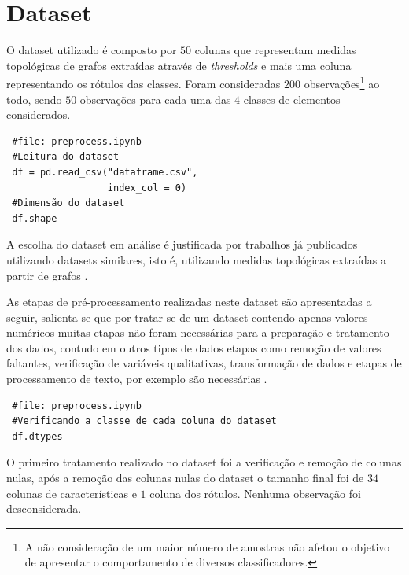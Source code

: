 \documentclass[
	article,			%
	11pt,				%
	oneside,			%
	a4paper,			%
	english,			%
	brazil,				%
	sumario=tradicional
	]{abntex2}
\begin{document}
\textual

\section{Dataset}

O dataset utilizado é composto por $50$ colunas que representam medidas topológicas de grafos extraídas através de \textit{thresholds} e mais uma coluna representando os rótulos das classes. Foram consideradas $200$ observações\footnote{A não consideração de um maior número de amostras não afetou o objetivo de apresentar o comportamento de diversos classificadores.} ao todo, sendo $50$ observações para cada uma das $4$ classes de elementos considerados. 

\begin{verbatim}
 #file: preprocess.ipynb
 #Leitura do dataset
 df = pd.read_csv("dataframe.csv", 
                  index_col = 0)
 #Dimensão do dataset
 df.shape
\end{verbatim}


A escolha do dataset em análise é justificada por trabalhos já publicados utilizando datasets similares, isto é, utilizando medidas topológicas extraídas a partir de grafos \cite{Childs2009, Ito2018}.

As etapas de pré-processamento realizadas neste dataset são apresentadas a seguir, salienta-se que por tratar-se de um dataset contendo apenas valores numéricos  muitas etapas não foram necessárias para a preparação e tratamento dos dados, contudo em outros tipos de dados etapas como remoção de valores faltantes, verificação de variáveis qualitativas, transformação de dados e etapas de processamento de texto, por exemplo são necessárias \cite{garcia2015data}.

\begin{verbatim}
 #file: preprocess.ipynb
 #Verificando a classe de cada coluna do dataset
 df.dtypes
\end{verbatim}

O primeiro tratamento realizado no dataset foi a verificação e remoção de colunas nulas, após a remoção das colunas nulas do dataset o tamanho final foi de $34$ colunas de características e $1$ coluna dos rótulos. Nenhuma observação foi desconsiderada.
\end{document}
